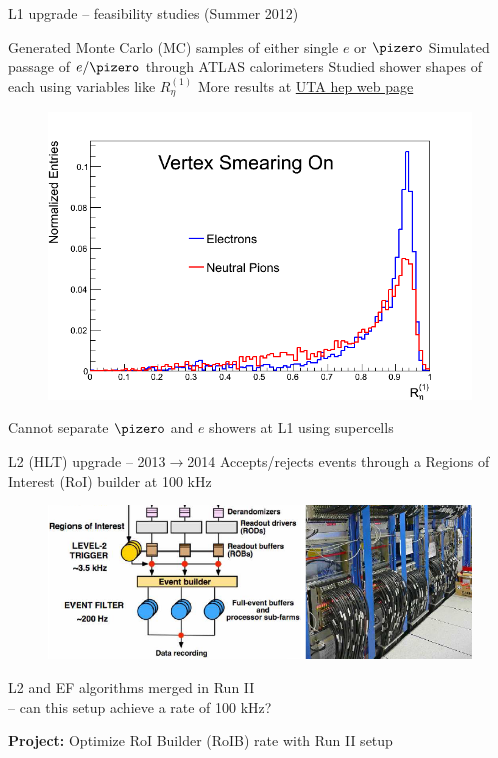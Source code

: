 \documentclass[10pt]{beamer}
\begin{document}
\begin{frame}{L1 upgrade -- feasibility studies (Summer 2012)}
\begin{outline}
\1 Generated Monte Carlo (MC) samples of either single $e$ or $\pizero$ 
\1 Simulated passage of $e/\pizero$ through ATLAS calorimeters
\1 Studied shower shapes of each using variables like $R_{\eta}^{(1)}$
	\2 More results at \href{http://www-hep.uta.edu/hep_notes/atlas/atlas_0002.pdf}{UTA hep web page}
\end{outline}
\vspace*{-0.8\baselineskip}
\begin{figure}
\centering
 \includegraphics[width=0.8\linewidth]{figures/RetaVx.png}%
\end{figure}
\vspace*{-\baselineskip}
{\color{blue}\large Cannot separate $\pizero$ and $e$ showers at L1 using supercells}
\end{frame}

\begin{frame}{L2 (HLT) upgrade --  2013$\to$2014}
Accepts/rejects events through a Regions of Interest (RoI) builder at 100 kHz
\begin{figure}
\centering
\includegraphics[width=\linewidth]{figures/trigger_l2.png}
\end{figure}
\vspace*{-\baselineskip}
 L2 and EF algorithms merged in Run II \\
 -- {\color{blue} can this setup achieve a rate of 100 kHz?}
\begin{outline}
\1 {\bf Project:} Optimize RoI Builder (RoIB) rate with Run II setup 
\end{outline}
\end{frame}
\end{document}
